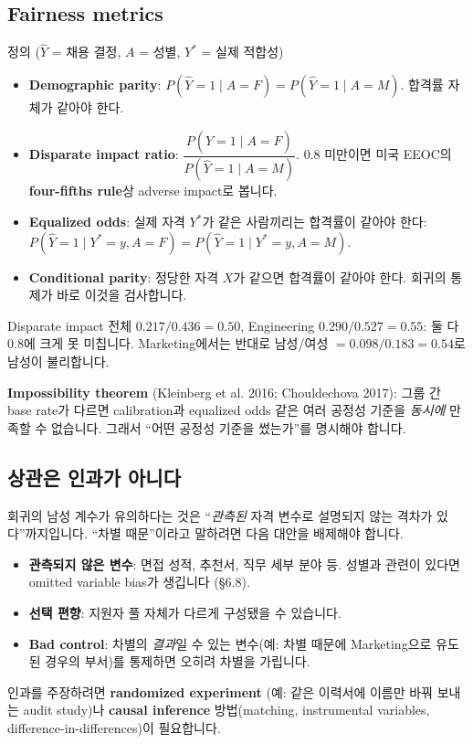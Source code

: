 \documentclass[11pt,a4paper]{article}
\newcommand{\term}[1]{\textbf{#1}}
\begin{document}
\subsection{Fairness metrics}
\begin{defbox}{정의 ($\hat Y$ = 채용 결정, $A$ = 성별, $Y^*$ = 실제 적합성)}
\begin{itemize}
\item \term{Demographic parity}: $P(\hat Y=1\mid A=F)=P(\hat Y=1\mid A=M)$. 합격률 자체가 같아야 한다.
\item \term{Disparate impact ratio}: $\dfrac{P(\hat Y=1\mid A=F)}{P(\hat Y=1\mid A=M)}$. 0.8 미만이면 미국 EEOC의 \term{four-fifths rule}상 adverse impact로 봅니다.
\item \term{Equalized odds}: 실제 자격 $Y^*$가 같은 사람끼리는 합격률이 같아야 한다: $P(\hat Y=1\mid Y^*=y,A=F)=P(\hat Y=1\mid Y^*=y,A=M)$.
\item \term{Conditional parity}: 정당한 자격 $X$가 같으면 합격률이 같아야 한다. 회귀의 통제가 바로 이것을 검사합니다.
\end{itemize}
\end{defbox}

\begin{databox}{Disparate impact}
전체 $0.217/0.436=0.50$, Engineering $0.290/0.527=0.55$: 둘 다 0.8에 크게 못 미칩니다. Marketing에서는 반대로 남성/여성 $=0.098/0.183=0.54$로 남성이 불리합니다.
\end{databox}

\textbf{Impossibility theorem} (Kleinberg et al. 2016; Chouldechova 2017): 그룹 간 base rate가 다르면 calibration과 equalized odds 같은 여러 공정성 기준을 \emph{동시에} 만족할 수 없습니다. 그래서 ``어떤 공정성 기준을 썼는가''를 명시해야 합니다.

\subsection{상관은 인과가 아니다}
회귀의 남성 계수가 유의하다는 것은 ``\emph{관측된} 자격 변수로 설명되지 않는 격차가 있다''까지입니다. ``차별 때문''이라고 말하려면 다음 대안을 배제해야 합니다.
\begin{itemize}
\item \textbf{관측되지 않은 변수}: 면접 성적, 추천서, 직무 세부 분야 등. 성별과 관련이 있다면 omitted variable bias가 생깁니다 (\S6.8).
\item \textbf{선택 편향}: 지원자 풀 자체가 다르게 구성됐을 수 있습니다.
\item \textbf{Bad control}: 차별의 \emph{결과}일 수 있는 변수(예: 차별 때문에 Marketing으로 유도된 경우의 부서)를 통제하면 오히려 차별을 가립니다.
\end{itemize}
인과를 주장하려면 \term{randomized experiment} (예: 같은 이력서에 이름만 바꿔 보내는 audit study)나 \term{causal inference} 방법(matching, instrumental variables, difference-in-differences)이 필요합니다.
\end{document}
